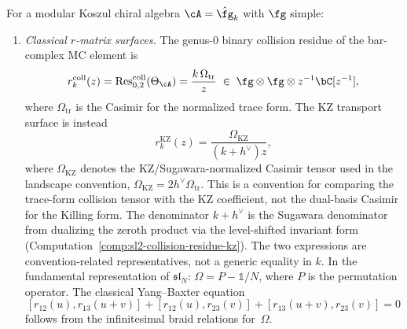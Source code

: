 \begin{proposition}
\label{prop:rmatrix-from-bar}
For a modular Koszul chiral algebra $\cA = \hat{\fg}_k$ with
$\fg$ simple:
\begin{enumerate}[label=\textup{(\roman*)}]
\item \emph{Classical $r$-matrix surfaces.}
 The genus-$0$ binary collision residue of the bar-complex MC
 element is
 \begin{equation}\label{eq:classical-r-from-bar}
 r^{\mathrm{coll}}_k(z)
 = \operatorname{Res}^{\mathrm{coll}}_{0,2}(\Theta_\cA)
 = \frac{k\,\Omega_{\mathrm{tr}}}{z}
 \;\in\; \fg \otimes \fg \otimes z^{-1}\bC[z^{-1}],
 \end{equation}
 where \(\Omega_{\mathrm{tr}}\) is the Casimir for the normalized
 trace form. The KZ transport surface is instead
 \begin{equation}\label{eq:kz-r-from-bar}
 r^{\mathrm{KZ}}_k(z)
 =\frac{\Omega_{\mathrm{KZ}}}{(k+h^\vee)z},
 \end{equation}
 where \(\Omega_{\mathrm{KZ}}\) denotes the KZ/Sugawara-normalized
 Casimir tensor used in the landscape convention,
 \(\Omega_{\mathrm{KZ}}=2h^\vee\Omega_{\mathrm{tr}}\). This is a
 convention for comparing the trace-form collision tensor with the
 KZ coefficient, not the dual-basis Casimir for the Killing form.
 The denominator \(k+h^\vee\) is the Sugawara denominator from
 dualizing the zeroth product via the level-shifted invariant form
 \textup{(}Computation~\textup{\ref{comp:sl2-collision-residue-kz}}\textup{)}.
 The two expressions are convention-related representatives, not a
 generic equality in \(k\).
 In the fundamental representation of $\mathfrak{sl}_N$:
 $\Omega = P - \mathbb{1}/N$, where $P$ is the permutation
 operator. The classical Yang--Baxter equation
 \begin{equation}\label{eq:cybe-bar}
 [r_{12}(u), r_{13}(u{+}v)] + [r_{12}(u), r_{23}(v)]
 + [r_{13}(u{+}v), r_{23}(v)] = 0
 \end{equation}
 follows from the infinitesimal braid relations for~$\Omega$.


\end{enumerate}
\end{proposition}

